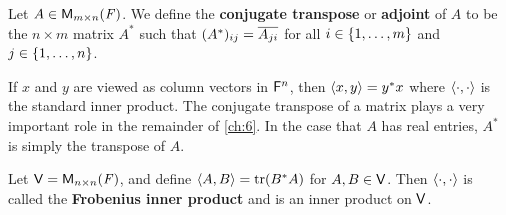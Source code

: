 \begin{defn}\label{6.1.5}
	Let \(A \in \mathsf{M}_{{m} \times n}({\mathit{F}})\).
	We define the \textbf{conjugate transpose} or \textbf{adjoint} of \(A\) to be the \(n \times m\) matrix \(A^*\) such that \((A^*)_{i j} = \overline{A_{j i}}\) for all \(i \in \left\lbrace1, \dots, m\right\rbrace\) and \(j \in \left\lbrace1, \dots, n\right\rbrace\).
\end{defn}

\begin{note}
	If \(x\) and \(y\) are viewed as column vectors in \(\mathsf{F}^n\), then \(\left\langle x, y\right\rangle = y^* x\) where \(\left\langle\cdot, \cdot\right\rangle\) is the standard inner product.
	The conjugate transpose of a matrix plays a very important role in the remainder of \cref{ch:6}.
	In the case that \(A\) has real entries, \(A^*\) is simply the transpose of \(A\).
\end{note}

\begin{eg}\label{6.1.6}
	Let \(\mathsf{V} = \mathsf{M}_{{n} \times n}({\mathit{F}})\), and define \(\inn{A, B} = \tr(B^* A)\) for \(A, B \in \mathsf{V}\).
	Then \(\left\langle\cdot, \cdot\right\rangle\) is called the \textbf{Frobenius inner product} and is an inner product on \(\mathsf{V}\).
\end{eg}


